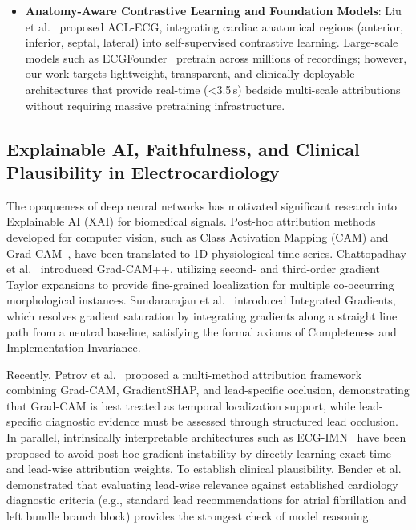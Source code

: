\documentclass[12pt]{elsarticle}
\begin{document}
\begin{itemize}
    \item \textbf{Anatomy-Aware Contrastive Learning and Foundation Models}: Liu et al.~\cite{liu2026acl} proposed ACL-ECG, integrating cardiac anatomical regions (anterior, inferior, septal, lateral) into self-supervised contrastive learning. Large-scale models such as ECGFounder~\cite{li2025ecgfounder} pretrain across millions of recordings; however, our work targets lightweight, transparent, and clinically deployable architectures that provide real-time (<3.5\,s) bedside multi-scale attributions without requiring massive pretraining infrastructure.
\end{itemize}

\subsection{Explainable AI, Faithfulness, and Clinical Plausibility in Electrocardiology}
The opaqueness of deep neural networks has motivated significant research into Explainable AI (XAI) for biomedical signals. Post-hoc attribution methods developed for computer vision, such as Class Activation Mapping (CAM) and Grad-CAM~\cite{selvaraju2017grad}, have been translated to 1D physiological time-series. Chattopadhay et al.~\cite{chattopadhay2018grad} introduced Grad-CAM++, utilizing second- and third-order gradient Taylor expansions to provide fine-grained localization for multiple co-occurring morphological instances. Sundararajan et al.~\cite{sundararajan2017axiomatic} introduced Integrated Gradients, which resolves gradient saturation by integrating gradients along a straight line path from a neutral baseline, satisfying the formal axioms of Completeness and Implementation Invariance. 

Recently, Petrov et al.~\cite{stacked_xai2025} proposed a multi-method attribution framework combining Grad-CAM, GradientSHAP, and lead-specific occlusion, demonstrating that Grad-CAM is best treated as temporal localization support, while lead-specific diagnostic evidence must be assessed through structured lead occlusion. In parallel, intrinsically interpretable architectures such as ECG-IMN~\cite{ecg_imn2026} have been proposed to avoid post-hoc gradient instability by directly learning exact time- and lead-wise attribution weights. To establish clinical plausibility, Bender et al.~\cite{bender2022relevance} demonstrated that evaluating lead-wise relevance against established cardiology diagnostic criteria (e.g., standard lead recommendations for atrial fibrillation and left bundle branch block) provides the strongest check of model reasoning. 
\end{document}
